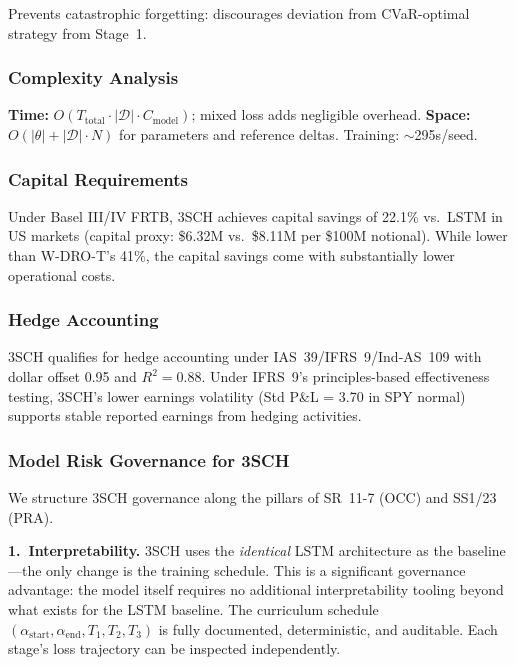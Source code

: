 Prevents catastrophic forgetting: discourages deviation from CVaR-optimal strategy from Stage~1.

\subsubsection{Complexity Analysis}

\textbf{Time:} $O(T_{\text{total}} \cdot |\mathcal{D}| \cdot C_{\text{model}})$; mixed loss adds negligible overhead. \textbf{Space:} $O(|\theta| + |\mathcal{D}| \cdot N)$ for parameters and reference deltas. Training: $\sim$295s/seed.

\subsubsection{Capital Requirements}

Under Basel III/IV FRTB, 3SCH achieves capital savings of 22.1\% vs.\ LSTM in US markets (capital proxy: \$6.32M vs.\ \$8.11M per \$100M notional). While lower than W-DRO-T's 41\%, the capital savings come with substantially lower operational costs.

\subsubsection{Hedge Accounting}

3SCH qualifies for hedge accounting under IAS~39/IFRS~9/Ind-AS~109 with dollar offset 0.95 and $R^2 = 0.88$. Under IFRS~9's principles-based effectiveness testing, 3SCH's lower earnings volatility (Std P\&L = 3.70 in SPY normal) supports stable reported earnings from hedging activities.

\subsubsection{Model Risk Governance for 3SCH}

We structure 3SCH governance along the pillars of SR~11-7 (OCC) and SS1/23 (PRA).

\textbf{1.\ Interpretability.}
3SCH uses the \emph{identical} LSTM architecture as the baseline---the only change is the training schedule.  This is a significant governance advantage: the model itself requires no additional interpretability tooling beyond what exists for the LSTM baseline.  The curriculum schedule $(\alpha_{\mathrm{start}}, \alpha_{\mathrm{end}}, T_1, T_2, T_3)$ is fully documented, deterministic, and auditable.  Each stage's loss trajectory can be inspected independently.

